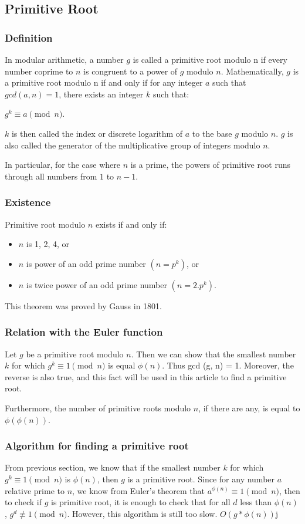 \documentclass[8pt, a4paper, oneside, twocolumn]{extarticle}
\begin{document}
\subsection{Primitive Root}
\subsubsection{Definition}

In modular arithmetic, a number $g$ is called a primitive root modulo n if every number coprime to $n$ is congruent to a power of $g$ modulo $n$. Mathematically, $g$ is a primitive root modulo n if and only if for any integer $a$ such that $gcd(a, n) = 1$, there exists an integer $k$ such that:

$g^k \equiv a \pmod n$.

$k$ is then called the index or discrete logarithm of $a$ to the base $g$ modulo $n$. $g$ is also called the generator of the multiplicative group of integers modulo $n$.

In particular, for the case where $n$ is a prime, the powers of primitive root runs through all numbers from $1$ to $n-1$.
\subsubsection{Existence}

Primitive root modulo $n$ exists if and only if:
\begin{itemize}
    \item $n$ is 1, 2, 4, or
    \item $n$ is power of an odd prime number $(n = p^k)$, or
    \item $n$ is twice power of an odd prime number $(n = 2 . p^k)$.
\end{itemize}
This theorem was proved by Gauss in 1801.
\subsubsection{Relation with the Euler function}

Let $g$ be a primitive root modulo $n$. Then we can show that the smallest number $k$ for which $g^k \equiv 1 \pmod n$ is equal $\phi (n)$. Thus gcd (g, n) = 1. Moreover, the reverse is also true, and this fact will be used in this article to find a primitive root.

Furthermore, the number of primitive roots modulo $n$, if there are any, is equal to $\phi (\phi (n) )$.
\subsubsection{Algorithm for finding a primitive root}
From previous section, we know that if the smallest number $k$ for which $g^k \equiv 1 \pmod n$ is $\phi (n)$, then $g$ is a primitive root. Since for any number $a$ relative prime to $n$, we know from Euler's theorem that $a ^ { \phi (n) } \equiv 1 \pmod n$, then to check if $g$ is primitive root, it is enough to check that for all $d$ less than $\phi (n)$, $g^d \not \equiv 1 \pmod n$. However, this algorithm is still too slow. $O(g * \phi (n))$j
\end{document}
